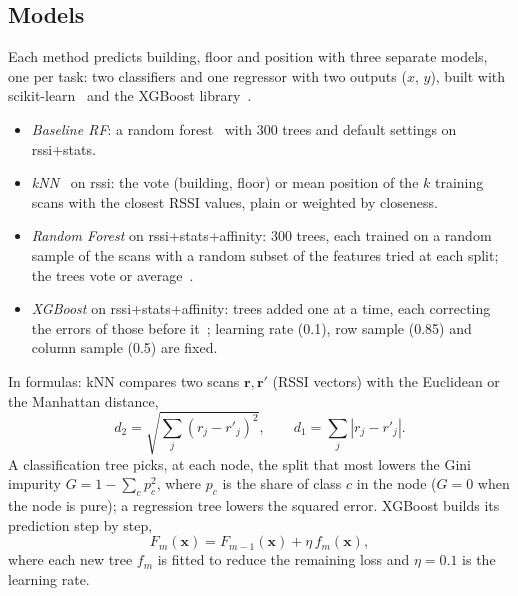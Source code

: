 \subsection{Models}\label{sec:models}
Each method predicts building, floor and position with three separate models,
one per task: two classifiers and one regressor with two outputs ($x$, $y$),
built with scikit-learn~\cite{pedregosa2011scikit} and the XGBoost
library~\cite{chen2016xgboost}.
\begin{itemize}
\item \emph{Baseline RF}: a random forest~\cite{breiman2001random} with 300
  trees and default settings on rssi+stats.
\item \emph{kNN}~\cite{cover1967nearest} on rssi: the vote (building, floor)
  or mean position of the $k$ training scans with the closest RSSI values,
  plain or weighted by closeness.
\item \emph{Random Forest} on rssi+stats+affinity: 300 trees, each trained on
  a random sample of the scans with a random subset of the features tried at
  each split; the trees vote or average~\cite{breiman2001random}.
\item \emph{XGBoost} on rssi+stats+affinity: trees added one at a time, each
  correcting the errors of those before it~\cite{chen2016xgboost}; learning
  rate (0.1), row sample (0.85) and column sample (0.5) are fixed.
\end{itemize}
In formulas: kNN compares two scans $\mathbf{r},\mathbf{r}'$ (RSSI vectors)
with the Euclidean or the Manhattan distance,
\begin{equation}
  d_2=\sqrt{\textstyle\sum_j (r_j-r'_j)^2},\qquad
  d_1=\textstyle\sum_j |r_j-r'_j|.
  \label{eq:knn}
\end{equation}
A classification tree picks, at each node, the split that most lowers the Gini
impurity $G=1-\sum_c p_c^2$, where $p_c$ is the share of class $c$ in the node
($G=0$ when the node is pure); a regression tree lowers the squared error.
XGBoost builds its prediction step by step,
\begin{equation}
  F_m(\mathbf{x})=F_{m-1}(\mathbf{x})+\eta\,f_m(\mathbf{x}),
  \label{eq:boost}
\end{equation}
where each new tree $f_m$ is fitted to reduce the remaining loss and
$\eta=0.1$ is the learning rate.

